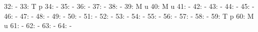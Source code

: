 \documentclass[nojss]{jss}
\begin{document}
\begin{Schunk}
\begin{Soutput}
 32:                                                                          -
 33:                                          T                               p
 34:                                                                          -
 35:                                                                          -
 36:                                                                          -
 37:                                                                          -
 38:                                                                          -
 39:                                          M                               u
 40:                                          M                               u
 41:                                                                          -
 42:                                                                          -
 43:                                                                          -
 44:                                                                          -
 45:                                                                          -
 46:                                                                          -
 47:                                                                          -
 48:                                                                          -
 49:                                                                          -
 50:                                                                          -
 51:                                                                          -
 52:                                                                          -
 53:                                                                          -
 54:                                                                          -
 55:                                                                          -
 56:                                                                          -
 57:                                                                          -
 58:                                                                          -
 59:                                          T                               p
 60:                                          M                               u
 61:                                                                          -
 62:                                                                          -
 63:                                                                          -
 64:                                                                          -

\end{Soutput}
\end{Schunk}
\end{document}
